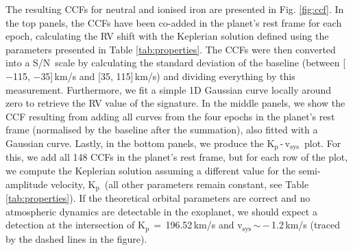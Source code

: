 \documentclass{aa}
\newcommand{\snr}{S/N}
\newcommand{\vsys}{v$_\mathrm{sys}$}
\newcommand{\kpvsys}{K$_\mathrm{p}$\,-\,v$_\mathrm{sys}$}
\newcommand{\kp}{K$_\mathrm{p}$}
\begin{document}
The resulting CCFs for neutral and ionised iron are presented in Fig. \ref{fig:ccf}. In the top panels, the CCFs have been co-added in the planet's rest frame for each epoch, calculating the RV shift with the Keplerian solution defined using the parameters presented in Table \ref{tab:properties}. The CCFs were then converted into a \snr\ scale by calculating the standard deviation of the baseline (between [$-$115, $-$35]\,km/s and [35, 115]\,km/s) and dividing everything by this measurement. Furthermore, we fit a simple 1D Gaussian curve locally around zero to retrieve the RV value of the signature. In the middle panels, we show the CCF resulting from adding all curves from the four epochs in the planet's rest frame (normalised by the baseline after the summation), also fitted with a Gaussian curve. 
Lastly, in the bottom panels, we produce the \kpvsys\ plot. For this, we add all 148 CCFs in the planet's rest frame, but for each row of the plot, we compute the Keplerian solution assuming a different value for the semi-amplitude velocity, \kp\ (all other parameters remain constant, see Table \ref{tab:properties}). If the theoretical orbital parameters are correct and no atmospheric dynamics are detectable in the exoplanet, we should expect a detection at the intersection of \kp\,$=\,$196.52\,km/s and \vsys\,$\sim$\,$-$\,1.2\,km/s (traced by the dashed lines in the figure). 


\end{document}
